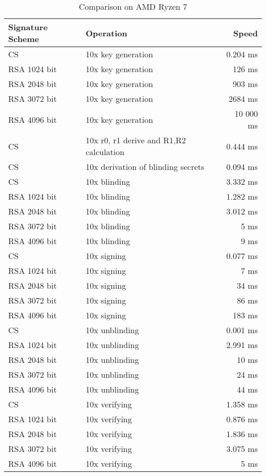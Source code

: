 \begin{table}[h]
    \centering
    \setupBfhTabular
    \begin{tabular}{llr}
        \rowcolor{BFH-tablehead}
        \textbf{Signature Scheme} & \textbf{Operation} & \textbf{Speed} \\\hline
        CS & 10x key generation & 0.204 ms \\\hline
        RSA 1024 bit & 10x key generation & 126 ms \\\hline
        RSA 2048 bit & 10x key generation & 903 ms \\\hline
        RSA 3072 bit & 10x key generation & 2684 ms \\\hline
        RSA 4096 bit & 10x key generation & 10 000 ms \\\hline
        \hline
        CS & 10x r0, r1 derive and R1,R2 calculation & 0.444 ms \\\hline
        CS & 10x derivation of blinding secrets & 0.094 ms \\\hline
        CS & 10x blinding & 3.332 ms \\\hline
        RSA 1024 bit & 10x blinding & 1.282 ms \\\hline
        RSA 2048 bit & 10x blinding & 3.012 ms \\\hline
        RSA 3072 bit & 10x blinding & 5 ms \\\hline
        RSA 4096 bit & 10x blinding & 9 ms \\\hline
        \hline
        CS & 10x signing & 0.077 ms \\\hline
        RSA 1024 bit & 10x signing & 7 ms \\\hline
        RSA 2048 bit & 10x signing & 34 ms \\\hline
        RSA 3072 bit & 10x signing & 86 ms \\\hline
        RSA 4096 bit & 10x signing & 183 ms \\\hline
        \hline
        CS & 10x unblinding & 0.001 ms \\\hline
        RSA 1024 bit & 10x unblinding & 2.991 ms \\\hline
        RSA 2048 bit & 10x unblinding & 10 ms \\\hline
        RSA 3072 bit & 10x unblinding & 24 ms \\\hline
        RSA 4096 bit & 10x unblinding & 44 ms \\\hline
        \hline
        CS & 10x verifying & 1.358 ms \\\hline
        RSA 1024 bit & 10x verifying & 0.876 ms \\\hline
        RSA 2048 bit & 10x verifying & 1.836 ms \\\hline
        RSA 3072 bit & 10x verifying & 3.075 ms \\\hline
        RSA 4096 bit & 10x verifying & 5 ms \\\hline
    \end{tabular}
    \caption{Comparison on AMD Ryzen 7}
    \label{tab:comp-sign-amd-ryzen-7}
\end{table}

